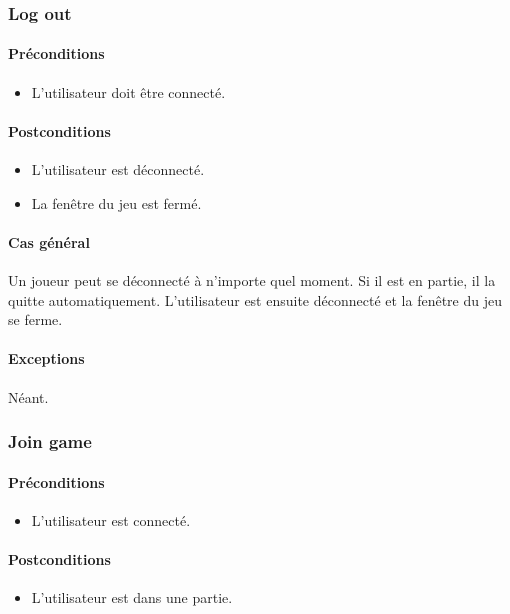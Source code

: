 \documentclass[a4paper,11pt]{report}
\begin{document}
\subsubsection{Log out}
\paragraph{Préconditions}
\begin{itemize}
 \item L'utilisateur doit être connecté.
\end{itemize}
\paragraph{Postconditions}
\begin{itemize}
 \item L'utilisateur est déconnecté.
 \item La fenêtre du jeu est fermé.
\end{itemize}
\paragraph{Cas général}
Un joueur peut se déconnecté à n'importe quel moment. Si il est en partie, il la quitte automatiquement. L'utilisateur
est ensuite déconnecté et la fenêtre du jeu se ferme.
\paragraph{Exceptions} Néant.
\subsubsection{Join game}
\paragraph{Préconditions}
\begin{itemize}
 \item L'utilisateur est connecté.
\end{itemize}
\paragraph{Postconditions}
\begin{itemize}
 \item L'utilisateur est dans une partie.
\end{itemize}
\end{document}
